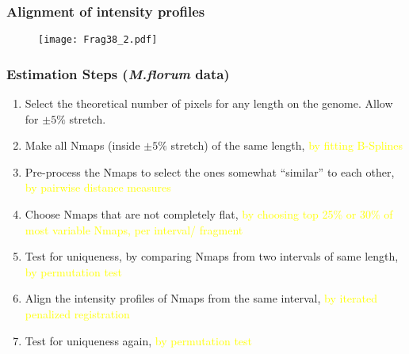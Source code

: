 \documentclass[10pt,dvipsnames,table]{beamer}
\begin{document}
\begin{frame}
\frametitle{Alignment of intensity profiles}
\begin{figure}
\texttt{[image: Frag38\_2.pdf]}
\end{figure}
\end{frame}

\begin{frame}
\frametitle{Estimation Steps ({\emph{M.florum}} data)}
\begin{enumerate}
\item Select the theoretical number of pixels for any length on the genome. Allow for $\pm 5\%$ stretch. 
\item Make all Nmaps (inside $\pm 5\%$ stretch) of the same length, {\textcolor{yellow}{by fitting B-Splines}}
\item Pre-process the Nmaps to select the ones somewhat ``similar'' to each other, {\textcolor{yellow}{by pairwise distance measures}}
\item Choose Nmaps that are not completely flat, {\textcolor{yellow}{by choosing top 25\% or 30\% of most variable Nmaps, per interval/ fragment}}
\item Test for uniqueness, by comparing Nmaps from two intervals of same length, {\textcolor{yellow}{by permutation test}}
\item Align the intensity profiles of Nmaps from the same interval, {\textcolor{yellow}{by iterated penalized registration}}
\item Test for uniqueness again, {\textcolor{yellow}{by permutation test}}
\end{enumerate}
\end{frame}
\end{document}
